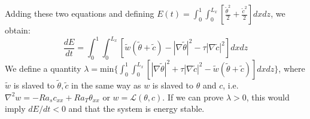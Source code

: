 \documentclass{article}
\newcommand{\grad}[1]{\nabla{#1}}
\newcommand{\lap}[1]{\nabla^{2}{#1}}
\begin{document}
%
Adding these two equations and defining $\boxed{E(t) = \int_{0}^{1} \int_{0}^{L_{x}} \left[ \frac{\tilde{\theta}^{2}}{2} + \frac{\tilde{c}^{2}}{2} \right] dx dz } $, we obtain:
\begin{equation}\label{eq:energy-stab-formulation}
 \frac{dE}{dt} =  \int_{0}^{1} \int_{0}^{L_{x}}\left[ \tilde{w} (\tilde{\theta} + \tilde{c})   - |\grad{\tilde{\theta}}|^{2} - \tau |\grad{\tilde{c}}|^{2} \right]dx dz
\end{equation}
We define a quantity $\lambda = \textrm{min} \{ \int_{0}^{1} \int_{0}^{L_{x}} \left[|\grad{\tilde{\theta}}|^{2} + \tau |\grad{\tilde{c}}|^{2} - \tilde{w} (\tilde{\theta}+ \tilde{c}) \right] dxdz\}$, where $\tilde{w}$ is slaved to $\tilde{\theta}, \tilde{c}$ in the same way as $w$ is slaved to $\theta$ and $c$, i.e. $\lap{w} = -Ra_{s} c_{xx} + Ra_{T} \theta_{xx}$ or $w = \mathcal{L}(\theta, c)$. If we can prove $\lambda > 0$, this would imply $dE/dt < 0$ and that the system is energy stable. 
\end{document}
